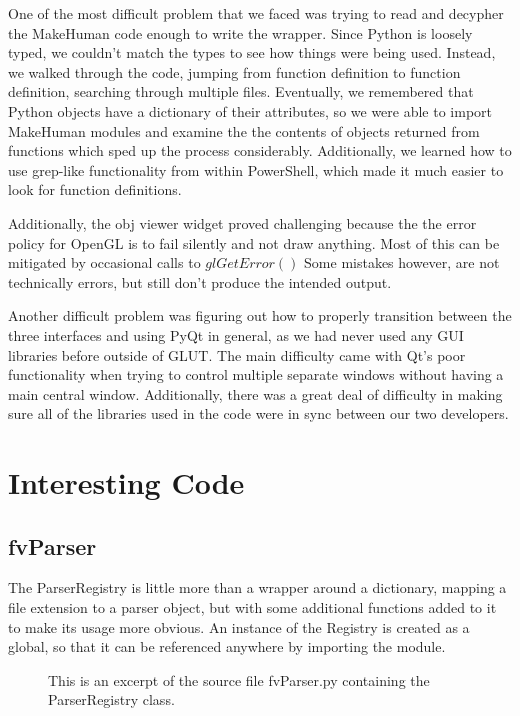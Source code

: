 \documentclass[letterpaper,10pt, onecolumn, draftclsnofoot]{IEEEtran}
\begin{document}
One of the most difficult problem that we faced was trying to read and decypher the MakeHuman code enough to write the wrapper. Since Python is loosely typed, we couldn't match the types to see how things were being used. Instead, we walked through the code, jumping from function definition to function definition, searching through multiple files. Eventually, we remembered that Python objects have a dictionary of their attributes, so we were able to import MakeHuman modules and examine the the contents of objects returned from functions which sped up the process considerably. Additionally, we learned how to use grep-like functionality from within PowerShell, which made it much easier to look for function definitions.

Additionally, the obj viewer widget proved challenging because the the error policy for OpenGL is to fail silently and not draw anything. Most of this can be mitigated by occasional calls to $glGetError()$ Some mistakes however, are not technically errors, but still don't produce the intended output.

Another difficult problem was figuring out how to properly transition between the three interfaces and using PyQt in general, as we had never used any GUI libraries before outside of GLUT. The main difficulty came with Qt's poor functionality when trying to control multiple separate windows without having a main central window. Additionally, there was a great deal of difficulty in making sure all of the libraries used in the code were in sync between our two developers.

\section{Interesting Code} \label{interestingCode}

\subsection{fvParser} 

The ParserRegistry is little more than a wrapper around a dictionary, mapping a file extension to a parser object, but with some additional functions added to it to make its usage more obvious. An instance of the Registry is created as a global, so that it can be referenced anywhere by importing the module.

\begin{figure}[h]

\caption{This is an excerpt of the source file fvParser.py containing the ParserRegistry class.}
\end{figure}
\end{document}
